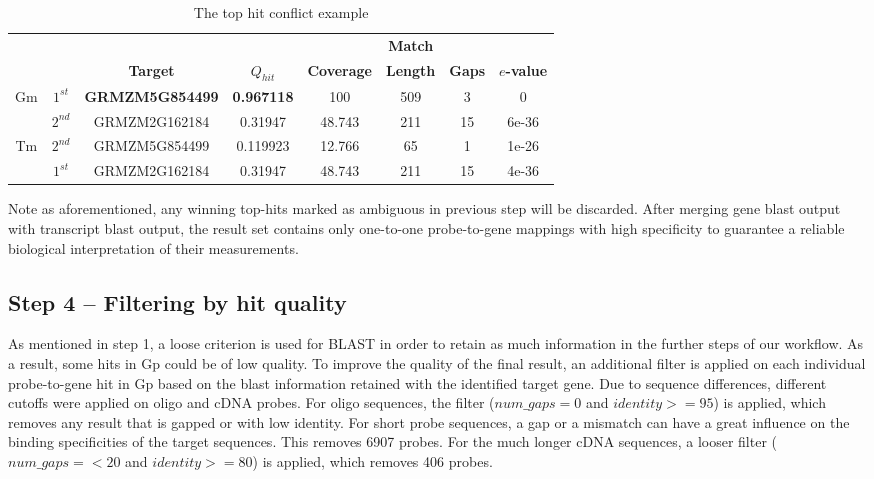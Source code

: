 \begin{table}
	\centering
	\begin{footnotesize}
	\caption{The top hit conflict example} 
	\label{tab:magic-conflict-tops}
	\begin{tabular}{@{}cc|cccccc@{}}
	\toprule
	& & & & & \textbf{Match} & & \\
	& & \textbf{Target} & \textbf{$Q_{hit}$} & \textbf{Coverage} & 
	\textbf{Length} & \textbf{Gaps} & \textbf{$e$-value} \\ 
	\midrule
	Gm &
	$1^{st}$ & \textbf{GRMZM5G854499} & \textbf{0.967118} & 100 & 509 & 3 & 0 \\
	& $2^{nd}$ & GRMZM2G162184 & 0.31947 & 48.743 & 211 & 15 & 6e-36 \\
	\hline
	Tm & 
	$2^{nd}$ & GRMZM5G854499 & 0.119923 & 12.766 & 65 & 1 & 1e-26 \\
	& $1^{st}$ & GRMZM2G162184 & 0.31947 & 48.743 & 211 & 15 & 4e-36 \\
	\bottomrule
	\end{tabular}
	\end{footnotesize}
\end{table}

Note as aforementioned, any winning top-hits marked as ambiguous in previous 
step will be discarded.
After merging gene blast output with transcript blast output, the result set 
contains only one-to-one probe-to-gene mappings with high specificity to 
guarantee a reliable biological interpretation of their measurements.



\subsection{Step 4 – Filtering by hit quality}


As mentioned in step 1, a loose criterion is used for BLAST in order to retain 
as much information in the 
further steps of our workflow. As a result, some hits in Gp could be of low 
quality. To improve the quality 
of the final result, an additional filter  is applied on each individual 
probe-to-gene hit in Gp based on the 
blast information retained with the identified target gene. Due to sequence 
differences, different cutoffs 
were applied on oligo and cDNA probes. For oligo sequences, the filter 
($num\_gaps = 0$ and $identity >= 95$) 
is applied, which removes any result that is gapped or with low identity. For 
short probe sequences, a gap 
or a mismatch can have a great influence on the binding specificities of the 
target sequences. This 
removes 6907 probes. 
For the much longer cDNA sequences, a looser filter ($num\_gaps =< 20$ and 
$identity >= 80$) is applied, which removes 406 probes. 


